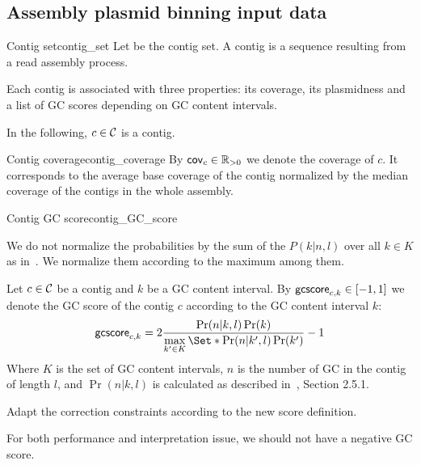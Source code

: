 \subsection{Assembly plasmid binning input data}

\begin{definition}{Contig set}{contig_set}
  Let \Contigs{} be the contig set.
  A contig is a sequence resulting from a read assembly process.
\end{definition}

Each contig is associated with three properties: its coverage, its plasmidness and a list of GC scores depending on GC content intervals.

In the following, \(c \in \mathcal{C}{}\) is a contig.

\begin{definition}{Contig coverage}{contig_coverage}
  By \(\mathsf{cov}_{c} \in \mathbb{R}_{>0}\) we denote the coverage of \(c\).
  It corresponds to the average base coverage of the contig normalized by the median coverage of the contigs in the whole assembly.
\end{definition}

\begin{definition}{Contig GC score}{contig_GC_score}
  \begin{newfeatbox}
    We do not normalize the probabilities by the sum of the \(P(k|n,l)\) over all \(k \in K\) as in~\cite{manePlasBinflowFlowbasedMILP2023}. We normalize them according to the maximum among them.
  \end{newfeatbox}
  Let \(c \in \mathcal{C}{}\) be a contig and \(k\) be a GC content interval.
  By \(\mathsf{gcscore}_{c, k} \in [-1, 1]\) we denote the GC score of the contig \(c\) according to the GC content interval \(k\):
  \[
    \gcscore{c}{k} = 2 \frac{\Pr(n|k,l)\Pr(k)}{\max\limits_{k' \in K}\Set*{\Pr(n|k',l)\Pr(k')}} - 1
  \]
  Where \(K\) is the set of GC content intervals, \(n\) is the number of GC in the contig of length \(l\), and \(\Pr(n|k,l)\) is calculated as described in~\cite{manePlasBinflowFlowbasedMILP2023}, Section 2.5.1.

  \begin{fixmebox}
    Adapt the correction constraints according to the new score definition.
  \end{fixmebox}

  \begin{questionbox}
    For both performance and interpretation issue, we should not have a negative GC score.
  \end{questionbox}
\end{definition}


